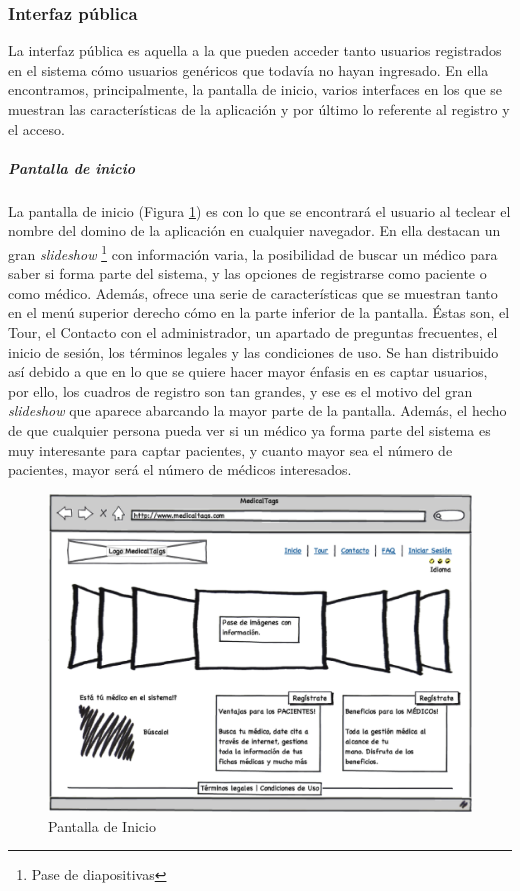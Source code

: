 	\subsubsection{Interfaz pública} %
		\label{sub:interfaz_publica}
		
		La interfaz pública es aquella a la que pueden acceder tanto usuarios registrados en el sistema cómo usuarios genéricos que todavía no hayan ingresado. En ella encontramos, principalmente, la pantalla de inicio, varios interfaces en los que se muestran las características de la aplicación y por último lo referente al registro y el acceso.
		
		\subparagraph{Pantalla de inicio} %
		\label{par:pantalla_de_inicio}
		
		La pantalla de inicio (Figura \ref{fig:pantalla_de_inicio}) es con lo que se encontrará el usuario al teclear el nombre del domino de la aplicación en cualquier navegador. En ella destacan un gran \textit{slideshow} \footnote{Pase de diapositivas} con información varia, la posibilidad de buscar un médico para saber si forma parte del sistema, y las opciones de registrarse como paciente o como médico. Además, ofrece una serie de características que se muestran tanto en el menú superior derecho cómo en la parte inferior de la pantalla. Éstas son, el Tour, el Contacto con el administrador, un apartado de preguntas frecuentes, el inicio de sesión, los términos legales y las condiciones de uso. Se han distribuido así debido a que en lo que se quiere hacer mayor énfasis en es captar usuarios, por ello, los cuadros de registro son tan grandes, y ese es el motivo del gran \textit{slideshow} que aparece abarcando la mayor parte de la pantalla. Además, el hecho de que cualquier persona pueda ver si un médico ya forma parte del sistema es muy interesante para captar pacientes, y cuanto mayor sea el número de pacientes, mayor será el número de médicos interesados.
	
		
		\begin{figure}[H]
		  \centering
		    \includegraphics[width=15cm]{img/eps/1_Inicio.eps}
		  \caption{Pantalla de Inicio}
		  \label{fig:pantalla_de_inicio}
		\end{figure}
			
